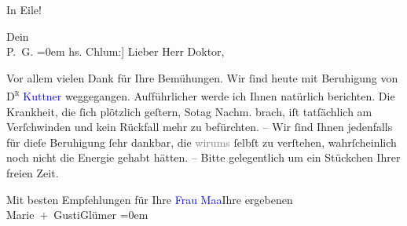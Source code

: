 \pstart
           In Eile!\pend
           
\pstart
           Dein {\\[\baselineskip]}\spacefill\mbox{P. G.}\pend
           \leftskip=0em{}
\pstart
           \noindent{}{\pb}{[}hs. Chlum:{]} Lieber Herr Doktor,\pend
           
\pstart
           Vor allem vielen Dank für Ihre Bemühungen. Wir ſind heute mit Beruhigung
               von \textsc{D\textsuperscript{r}}{ }\textcolor{blue}{Kuttner}{}\ledrightnote{\textcolor{blue}{Arthur Kuttner}} weggegangen. Auſführlicher werde ich
               Ihnen natürlich berichten. Die Krankheit, die {\pb}ſich
               plötzlich geſtern, So{\geminationn}tag{ }Nachm. brach, iſt tatſächlich am Verſchwinden und kein Rückfall mehr zu befürchten. – Wir ſind Ihnen
               jedenfalls für dieſe Beruhigung ſehr dankbar, die \textcolor{gray}{wir}\textcolor{gray}{ums} ſelbſt zu verſtehen, {\pb}wahrſcheinlich noch nicht die Energie gehabt hätten. – Bitte gelegentlich um ein
               Stückchen Ihrer freien Zeit.\pend
           
\pstart
           Mit besten Empfehlungen für Ihre \textcolor{blue}{Frau Ma{\geminationm}a}{}\ledrightnote{{$\rightarrow$}\textcolor{blue}{Louise Schnitzler}}{ }{\\[\baselineskip]}Ihre ergebenen {\\[\baselineskip]}\spacefill\mbox{Marie + GustiGlümer}\pend
           \leftskip=0em{}\endnumbering{}
\begin{anhang}
\end{anhang}
      